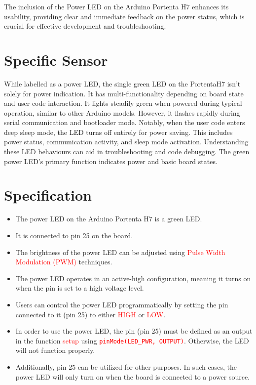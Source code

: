 The inclusion of the Power LED on the Arduino Portenta H7 enhances its usability, providing clear and immediate feedback on the power status, which is crucial for effective development and troubleshooting.

\section{Specific Sensor}
While labelled as a power LED, the single green LED on the PortentaH7 isn’t solely for power indication. It has multi-functionality depending on board state and user code interaction. It lights steadily green when powered during typical operation, similar to other Arduino models. However, it flashes rapidly during serial communication and bootloader mode. Notably, when the user code enters deep sleep mode, the LED turns off entirely for power saving. This includes power status, communication activity, and sleep mode activation. Understanding these LED behaviours can aid in troubleshooting and code debugging. The green power LED’s primary function indicates power and basic board states. \cite{arduino_portenta_h7_datasheet:2025}

\section{Specification}

\begin{itemize}
	
	\item The power LED on the Arduino Portenta H7 is a green LED.
	\item It is connected to pin 25 on the board.
	\item The brightness of the power LED can be adjusted using \textcolor{red}{Pulse Width Modulation (PWM)} techniques.
	\item The power LED operates in an active-high configuration, meaning it turns on when the pin is set to a high voltage level.
	\item Users can control the power LED programmatically by setting the pin connected to it (pin 25) to either \textcolor{red}{HIGH} or \textcolor{red}{LOW}.
	\item In order to use the power LED, the pin (pin 25) must be defined as an output in the function \textcolor{red}{setup} using \textcolor{red}{\texttt{pinMode(LED\_PWR, OUTPUT)}}. Otherwise, the LED will not function properly.
	\item Additionally, pin 25 can be utilized for other purposes. In such cases, the power LED will only turn on when the board is connected to a power source.
	
\end{itemize}


